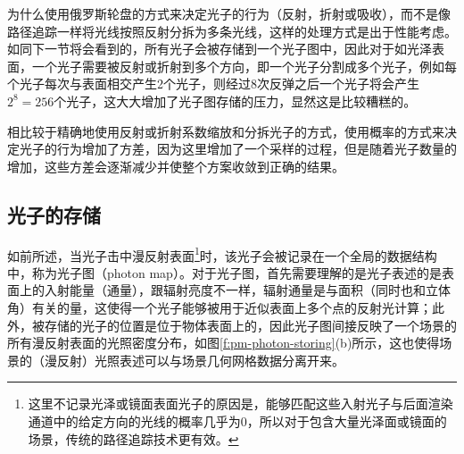 为什么使用俄罗斯轮盘的方式来决定光子的行为（反射，折射或吸收），而不是像路径追踪一样将光线按照反射分拆为多条光线，这样的处理方式是出于性能考虑。如同下一节将会看到的，所有光子会被存储到一个光子图中，因此对于如光泽表面，一个光子需要被反射或折射到多个方向，即一个光子分割成多个光子，例如每个光子每次与表面相交产生2个光子，则经过8次反弹之后一个光子将会产生$2^8=256$个光子，这大大增加了光子图存储的压力，显然这是比较糟糕的。

相比较于精确地使用反射或折射系数缩放和分拆光子的方式，使用概率的方式来决定光子的行为增加了方差，因为这里增加了一个采样的过程，但是随着光子数量的增加，这些方差会逐渐减少并使整个方案收敛到正确的结果。





\subsection{光子的存储}\label{sec:pm-photon-storing}
如前所述，当光子击中漫反射表面\footnote{这里不记录光泽或镜面表面光子的原因是，能够匹配这些入射光子与后面渲染通道中的给定方向的光线的概率几乎为0，所以对于包含大量光泽面或镜面的场景，传统的路径追踪技术更有效。}时，该光子会被记录在一个全局的数据结构中，称为光子图（photon map）。对于光子图，首先需要理解的是光子表述的是表面上的入射能量（通量），跟辐射亮度不一样，辐射通量是与面积（同时也和立体角）有关的量，这使得一个光子能够被用于近似表面上多个点的反射光计算；此外，被存储的光子的位置是位于物体表面上的，因此光子图间接反映了一个场景的所有漫反射表面的光照密度分布，如图\ref{f:pm-photon-storing}(b)所示，这也使得场景的（漫反射）光照表述可以与场景几何网格数据分离开来。

